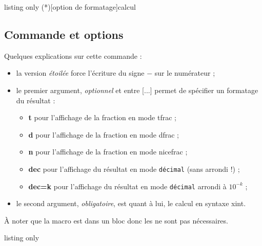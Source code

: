 \documentclass[a4paper,french,11pt]{article}
\newcommand\ctex[1]{\tcbox[vignettelatex]{#1}}
\newcommand\cmaj[1]{%
	{\tcbox[vignetteMaJ]{#1}\xspace}%
}
\newcommand\Cle[1]{{\bfseries\sffamily\textlangle \textcolor{orange!75!black}{#1}\textrangle}}
\begin{document}
\begin{PresCodeTexPL}{listing only}
\ConversionFraction(*)[option de formatage]{calcul}
\end{PresCodeTexPL}

\subsection{Commande et options}

\begin{cautionblock}
Quelques explications sur cette commande :

\begin{itemize}
	\item \cmaj{2.5.1} la version \textit{étoilée} force l'écriture du signe \og $-$ \fg{} sur le numérateur ;
	\item le premier argument, \textit{optionnel} et entre \textsf{[...]} permet de spécifier un formatage du résultat :
	\begin{itemize}
		\item \Cle{t} pour l'affichage de la fraction en mode \textsf{tfrac} ;
		\item \Cle{d} pour l'affichage de la fraction en mode \textsf{dfrac} ;
		\item \Cle{n} pour l'affichage de la fraction en mode \textsf{nicefrac} ;
		\item \Cle{dec} pour l'affichage du résultat en mode \texttt{décimal} (sans arrondi !) ;
		\item \Cle{dec=k} pour l'affichage du résultat en mode \texttt{décimal} arrondi à $10^{-k}$ ;
	\end{itemize}
	\item le second argument, \textit{obligatoire}, est quant à lui, le calcul en syntaxe \textsf{xint}.
\end{itemize}

À noter que la macro est dans un bloc \ctex{ensuremath} donc les \ctex{\$...\$} ne sont pas nécessaires.
\end{cautionblock}

\begin{PresCodeTexPL}{listing only}
\end{PresCodeTexPL}
\end{document}
